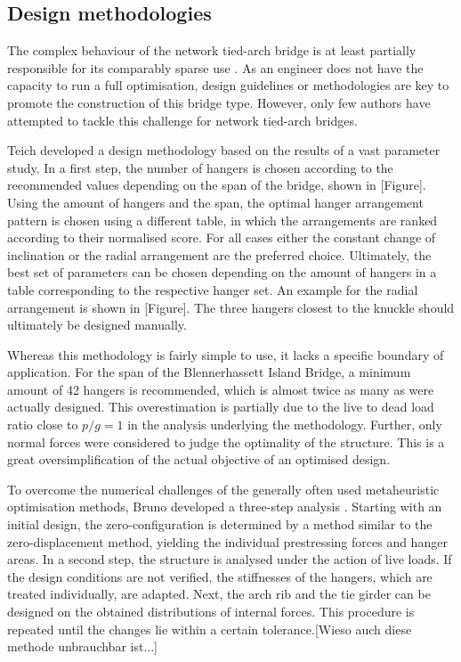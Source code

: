 \subsection{Design methodologies} \label{sec:rev_meth}
The complex behaviour of the network tied-arch bridge is at least partially responsible for its comparably sparse use \cite{Tveit2}. As an engineer does not have the capacity to run a full optimisation, design guidelines or methodologies are key to promote the construction of this bridge type. However, only few authors have attempted to tackle this challenge for network tied-arch bridges.

Teich developed a design methodology based on the results of a vast parameter study. In a first step, the number of hangers is chosen according to the recommended values depending on the span of the bridge, shown in [Figure]. Using the amount of hangers and the span, the optimal hanger arrangement pattern is chosen using a different table, in which the arrangements are ranked according to their normalised score. For all cases either the constant change of inclination or the radial arrangement are the preferred choice. Ultimately, the best set of parameters can be chosen depending on the amount of hangers in a table corresponding to the respective hanger set. An example for the radial arrangement is shown in [Figure]. The three hangers closest to the knuckle should ultimately be designed manually. 

Whereas this methodology is fairly simple to use, it lacks a specific boundary of application. For the span of the Blennerhassett Island Bridge, a minimum amount of 42 hangers is recommended, which is almost twice as many as were actually designed. This overestimation is partially due to the live to dead load ratio close to $p/g=1$ in the analysis underlying the methodology. Further, only normal forces were considered to judge the optimality of the structure. This is a great oversimplification of the actual objective of an optimised design.\medskip

To overcome the numerical challenges of the generally often used metaheuristic optimisation methods, Bruno developed a three-step analysis \cite{Bruno}. Starting with an initial design, the zero-configuration is determined by a method similar to the zero-displacement method, yielding the individual prestressing forces and hanger areas. In a second step, the structure is analysed under the action of live loads. If the design conditions are not verified, the stiffnesses of the hangers, which are treated individually, are adapted. Next, the arch rib and the tie girder can be designed on the obtained distributions of internal forces. This procedure is repeated until the changes lie within a certain tolerance.[Wieso auch diese methode unbrauchbar ist...]

